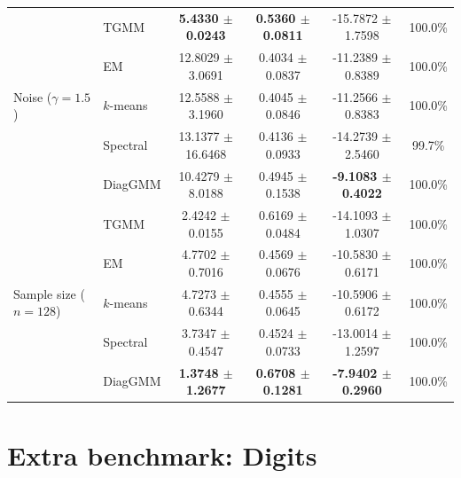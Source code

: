 \documentclass{article}
\begin{document}
\begin{table}[t]
{\begin{tabular}{llcccc}
\midrule
\multirow{5}{*}{Noise ($\gamma=1.5$)}
& TGMM & \textbf{5.4330 $\pm$ 0.0243} & \textbf{0.5360 $\pm$ 0.0811} & -15.7872 $\pm$ 1.7598 & 100.0\% \\
& EM & 12.8029 $\pm$ 3.0691 & 0.4034 $\pm$ 0.0837 & -11.2389 $\pm$ 0.8389 & 100.0\% \\
& $k$-means & 12.5588 $\pm$ 3.1960 & 0.4045 $\pm$ 0.0846 & -11.2566 $\pm$ 0.8383 & 100.0\% \\
& Spectral & 13.1377 $\pm$ 16.6468 & 0.4136 $\pm$ 0.0933 & -14.2739 $\pm$ 2.5460 & 99.7\% \\
& DiagGMM & 10.4279 $\pm$ 8.0188 & 0.4945 $\pm$ 0.1538 & \textbf{-9.1083 $\pm$ 0.4022} & 100.0\% \\
\midrule
\multirow{5}{*}{Sample size ($n=128$)}
& TGMM & 2.4242 $\pm$ 0.0155 & 0.6169 $\pm$ 0.0484 & -14.1093 $\pm$ 1.0307 & 100.0\% \\
& EM & 4.7702 $\pm$ 0.7016 & 0.4569 $\pm$ 0.0676 & -10.5830 $\pm$ 0.6171 & 100.0\% \\
& $k$-means & 4.7273 $\pm$ 0.6344 & 0.4555 $\pm$ 0.0645 & -10.5906 $\pm$ 0.6172 & 100.0\% \\
& Spectral & 3.7347 $\pm$ 0.4547 & 0.4524 $\pm$ 0.0733 & -13.0014 $\pm$ 1.2597 & 100.0\% \\
& DiagGMM & \textbf{1.3748 $\pm$ 1.2677} & \textbf{0.6708 $\pm$ 0.1281} & \textbf{-7.9402 $\pm$ 0.2960} & 100.0\% \\
\bottomrule
\end{tabular}%
}
\end{table}

\section{Extra benchmark: Digits}
\end{document}

